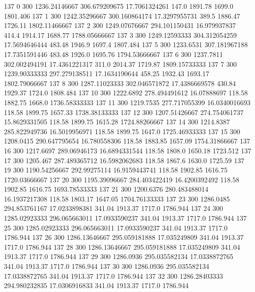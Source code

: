 137  0  300  1236.24146667  306.679209675  17.7061324261  147.0  1891.78  1699.0  1801.406 
137  1  300  1242.35296667  300.160864174  17.3297955731  389.5  1886.47  1726.11  1802.11466667 
137  2  300  1249.07676667  294.101150431  16.979937837  414.4  1914.17  1688.77  1788.05666667 
137  3  300  1249.12593333  304.312054259  17.5694646444  483.48  1946.9  1697.4  1807.484 
137  5  300  1233.6531  307.181967188  17.7351591446  483.48  1926.0  1695.76  1794.53666667 
137  6  300  1237.7811  302.002494191  17.4361221317  311.0  2014.37  1719.87  1809.15733333 
137  7  300  1239.90333333  297.279138511  17.1634190644  458.25  1932.43  1693.17  1802.79066667 
137  8  300  1287.11023333  302.046571872  17.4386669578  430.84  1929.37  1724.0  1808.484 
137  10  300  1222.6892  278.494491612  16.07888697  118.58  1882.75  1668.0  1736.58333333 
137  11  300  1219.7535  277.717055399  16.0340016693  118.58  1899.75  1657.33  1738.38133333 
137  12  300  1207.51426667  274.754061737  15.8629331505  118.58  1899.75  1615.28  1724.88266667 
137  14  300  1214.8387  285.822949736  16.5019956971  118.58  1899.75  1647.0  1725.46933333 
137  15  300  1208.0415  290.647795654  16.780558306  118.58  1883.85  1657.09  1754.31866667 
137  16  300  1217.6697  289.06946173  16.6894331544  118.58  1808.0  1650.18  1723.512 
137  17  300  1205.467  287.489365712  16.5982062683  118.58  1867.6  1630.0  1725.59 
137  19  300  1190.54256667  292.99275114  16.9159443741  118.58  1902.85  1616.75  1720.03666667 
137  20  300  1195.39096667  284.403422419  16.4200392492  118.58  1902.85  1616.75  1693.78533333 
137  21  300  1200.6376  280.483488014  16.1937217308  118.58  1803.17  1647.05  1704.76133333 
137  23  300  1286.0485  294.853761167  17.0233898381  341.04  1913.37  1717.0  1786.944 
137  24  300  1285.02923333  296.065663011  17.0933590237  341.04  1913.37  1717.0  1786.944 
137  25  300  1285.02923333  296.065663011  17.0933590237  341.04  1913.37  1717.0  1786.944 
137  26  300  1286.13646667  295.059181888  17.035249809  341.04  1913.37  1717.0  1786.944 
137  28  300  1286.13646667  295.059181888  17.035249809  341.04  1913.37  1717.0  1786.944 
137  29  300  1286.0936  295.035582134  17.0338872765  341.04  1913.37  1717.0  1786.944 
137  30  300  1286.0936  295.035582134  17.0338872765  341.04  1913.37  1717.0  1786.944 
137  32  300  1286.28403333  294.980232835  17.0306916833  341.04  1913.37  1717.0  1786.944 

